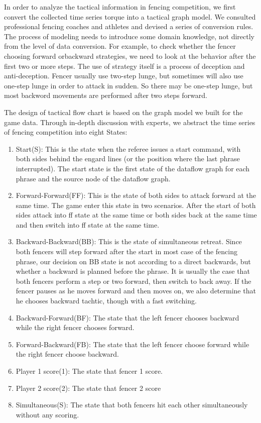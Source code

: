 \documentclass[journal]{vgtc}                %
\begin{document}
In order to analyze the tactical information in fencing competition, we first convert the collected time series torque into a tactical graph model.
We consulted professional fencing coaches and athletes and devised a series of conversion rules.
The process of modeling needs to introduce some domain knowledge, not directly from the level of data conversion.
For example, to check whether the fencer choosing forward orbackward strategies, we need to look at the behavior after the first two or more steps.
The use of strategy itself is a process of deception and anti-deception\cite{roi2008science}. Fencer usually use two-step lunge, but sometimes will also use one-step lunge in order to attack in sudden. So there may be one-step lunge, but most backword movements are performed after two steps forward.

The design of tactical flow chart is based on the graph model we built for the game data.
Through in-depth discussion with experts, we abstract the time series of fencing competition into eight States:
\begin{enumerate}
	\item Start(S): This is the state when the referee issues a start command, with both sides behind the engard lines (or the position where the last phrase interrupted). 
	The start state is the first state of the dataflow graph for each phrase and the source node of the dataflow graph.
	\item Forward-Forward(FF): This is the state of both sides to attack forward at the same time.
	The game enter this state in two scenarios. 
	After the start of both sides attack into ff state at the same time or both sides back at the same time and then switch into ff state at the same time.
	\item Backward-Backward(BB): This is the state of simultaneous retreat.
	Since both fencers will step forward after the start in most case of the fencing phrase, our decision on BB state is not according to a direct backwards, but whether a backward is planned before the phrase. 
	It is usually the case that both fencers perform a step or two forward, then switch to back away.
	If the fencer pauses as he moves forward and then moves on, we also determine that he chooses backward tachtic, though with a fast switching.
	\item Backward-Forward(BF): The state that the left fencer chooses backward while the right fencer chooses forward.
	\item Forward-Backward(FB): The state that the left fencer choose forward while the right fencer choose backward.
	\item Player 1 score(1): The state that fencer 1 score.
	\item Player 2 score(2): The state that fencer 2 score
	\item Simultaneous(S): The state that both fencers hit each other simultaneously without any scoring.
\end{enumerate}
\end{document}
